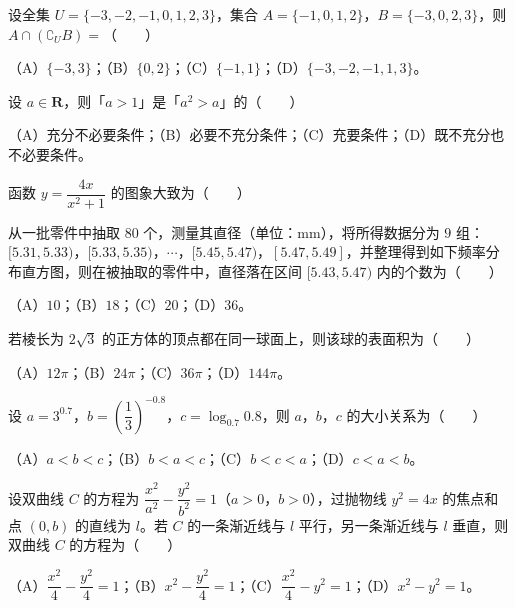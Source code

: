 \begin{question}
设全集 $U=\{-3,-2,-1,0,1,2,3\}$，集合 $A=\{-1,0,1,2\}$，$B=\{-3,0,2,3\}$，则 $A\cap(\complement_UB)=$\mbox{（　　）}

（A）$\{-3,3\}$；（B）$\{0,2\}$；（C）$\{-1,1\}$；（D）$\{-3,-2,-1,1,3\}$。

\end{question}
\begin{question}
设 $a\in\mathbf R$，则「$a>1$」是「$a^2>a$」的\mbox{（　　）}

（A）充分不必要条件；（B）必要不充分条件；（C）充要条件；（D）既不充分也不必要条件。

\Needspace{0.4\textheight}
\end{question}
\begin{question}
函数 $y=\dfrac{4x}{x^2+1}$ 的图象大致为\mbox{（　　）}
\nopagebreak[4]
\begin{center}\end{center}
\nopagebreak[4]
\Needspace{0.4\textheight}
\end{question}
\begin{question}
从一批零件中抽取 $80$ 个，测量其直径（单位：mm），将所得数据分为 $9$ 组：$[5.31,5.33)$，$[5.33,5.35)$，$\cdots$，$[5.45,5.47)$，$[5.47,5.49]$，并整理得到如下频率分布直方图，则在被抽取的零件中，直径落在区间 $[5.43,5.47)$ 内的个数为\mbox{（　　）}
\nopagebreak[4]
\begin{center}\end{center}
\nopagebreak[4]
（A）$10$；（B）$18$；（C）$20$；（D）$36$。

\end{question}
\begin{question}
若棱长为 $2\sqrt3$ 的正方体的顶点都在同一球面上，则该球的表面积为\mbox{（　　）}

（A）$12\pi$；（B）$24\pi$；（C）$36\pi$；（D）$144\pi$。

\end{question}
\begin{question}
设 $a=3^{0.7}$，$b=\left(\dfrac13\right)^{-0.8}$，$c=\log_{0.7}0.8$，则 $a$，$b$，$c$ 的大小关系为\mbox{（　　）}

（A）$a<b<c$；（B）$b<a<c$；（C）$b<c<a$；（D）$c<a<b$。

\end{question}
\begin{question}
设双曲线 $C$ 的方程为 $\dfrac{x^2}{a^2}-\dfrac{y^2}{b^2}=1$（$a>0$，$b>0$），过抛物线 $y^2=4x$ 的焦点和点 $(0,b)$ 的直线为 $l$。若 $C$ 的一条渐近线与 $l$ 平行，另一条渐近线与 $l$ 垂直，则双曲线 $C$ 的方程为\mbox{（　　）}

（A）$\dfrac{x^2}{4}-\dfrac{y^2}{4}=1$；（B）$x^2-\dfrac{y^2}{4}=1$；（C）$\dfrac{x^2}{4}-y^2=1$；（D）$x^2-y^2=1$。

\end{question}
